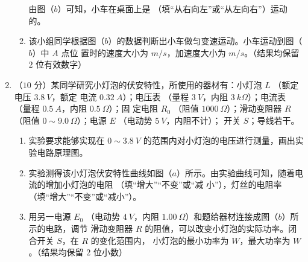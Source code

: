 \begin{enumerate}
\begin{enumerate}
由图（$ b $）可知，小车在桌面上是  （填“从右向左”或“从左向右”）运动的。


\item 
该小组同学根据图（$ b $）的数据判断出小车做匀变速运动。小车运动到图（$ b $）中 $ A $ 点位
置时的速度大小为  $ m/s $，加速度大小为  $ m/s $。（结果均保留 $ 2 $ 位有效数字）

\end{enumerate}



\newpage
\item 
（$ 10 $ 分）某同学研究小灯泡的伏安特性，所使用的器材有：小灯泡 $ L $ （额定电压 $ 3.8 \ V $，额定
电流 $ 0.32 \ A $）；电压表 \voltmetermytikz （量程 $ 3 \ V $，内阻 $ 3 \ k\Omega $）；电流表 \ammetermytikz （量程 $ 0.5 \ A $，内阻 $ 0.5 \ \Omega $）；固
定电阻 $ R_{0} $ （阻值 $ 1000 \ \Omega $）；滑动变阻器 $ R $ （阻值 $ 0 \sim 9.0 \ \Omega $）；电源 $ E $ （电动势 $ 5 \ V $，内阻不计）；
开关 $ S $；导线若干。
\begin{figure}[h!]
\centering

\end{figure}

\begin{enumerate}
\renewcommand{\labelenumi}{\arabic{enumi}.}
\item
实验要求能够实现在 $ 0 \sim 3.8 \ V $ 的范围内对小灯泡的电压进行测量，画出实验电路原理图。



\item 
实验测得该小灯泡伏安特性曲线如图（$ a $）所示。由实验曲线可知，随着电流的增加小灯泡的电阻  （填“增大”“不变”或“减
小”），灯丝的电阻率
（填“增大”“不变”或“减小”）。

\item 
用另一电源 $ E_{0} $ （电动势 $ 4 \ V $，内阻 $ 1.00 \ \Omega $）和题给器材连接成图（$ b $）所示的电路，调节
滑动变阻器 $ R $ 的阻值，可以改变小灯泡的实际功率。闭合开关 $ S $，在 $ R $ 的变化范围内，
小灯泡的最小功率为  $ W $，最大功率为  $ W $。（结果均保留 $ 2 $ 位小数）

\end{enumerate}


\end{enumerate}
